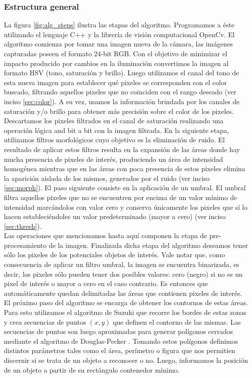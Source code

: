 \subsubsection{Estructura general}
La figura \ref{fig:alg_steps} ilustra las etapas del algoritmo. 
Programamos a \'este utilizando el lenguaje C++ y la librer\'ia de 
visi\'on computacional OpenCv.
El algoritmo comienza por tomar una imagen nueva de la c\'amara, las 
im\'agenes capturadas poseen el formato 24-bit RGB. Con el objetivo de 
minimizar el impacto producido por cambios en la iluminaci\'on 
convertimos la imagen al formato HSV (tono, saturaci\'on y brillo). Luego 
utilizamos el canal del tono de esta nueva imagen para establecer qu\'e 
pixeles se corresponden con el color buscado, filtrando aquellos 
pixeles que no coinciden con el rango deseado (ver inciso 
\ref{sec:color}). A su vez, usamos la informaci\'on brindada por los  canales de saturaci\'on y/o brillo para obtener m\'as precisi\'on sobre el color de los pixeles.\\
	\indent Descartamos los pixeles filtrados en el canal de saturaci\'on 
	realizando una operaci\'on l\'ogica and bit a bit con la imagen filtrada.  En la siguiente 
	etapa, utilizamos filtros morfol\'ogicos cuyo objetivo es la 
	eliminaci\'on de ruido. El resultado de aplicar estos filtros resulta 
	en la expansi\'on de las \'areas donde hay mucha presencia de pixeles de 
	inter\'es, produciendo un \'area de intensidad homog\'enea mientras que 
	en las \'areas con poca presencia de estos pixeles 
	elimina la aparici\'on aislada de los mismos, generados por el ruido (ver 
	inciso \ref{sec:morph}). El paso 
	siguiente consiste en la aplicaci\'on de un umbral. El umbral filtra 
	aquellos pixeles que no se encuentren por encima de un valor m\'inimo 
	de intensidad marc\'andolos con valor cero y conserva \'unicamente los 
	pixeles que s\'i lo hacen estableci\'endoles un valor predeterminado 
	(mayor a cero) (ver inciso \ref{sec:thresh}). \\
	\indent Las operaciones que mencionamos hasta aqu\'i componen la 
	etapa de  pre-procesamiento de la imagen. Finalizada dicha etapa del 
	algoritmo deseamos tener s\'olo los pixeles de los potenciales objetos de 
	inter\'es. Vale notar que, como consecuencia de aplicar un filtro 
	umbral, la imagen se encuentra binarizada, es decir, los pixeles s\'olo 
	pueden tener dos posibles valores: cero (negro) si no es un pixel de 
	inter\'es o mayor a cero en el caso contrario. Es entonces que 
	autom\'aticamente quedan delimitadas las \'areas que contienen pixeles 
	de inter\'es. El pr\'oximo paso del algoritmo se encarga de obtener los 
	contornos de estas \'areas. Para esto utilizamos el algoritmo de Suzuki 
	\cite{suzuki85} que recorre los bordes de estas zonas y crea 
	secuencias de puntos $(x,y)$ que definen el contorno de las mismas. 
	Las secuencias de puntos son luego aproximadas para generar pol\'igonos 
	cerrados mediante el algoritmo de Douglas-Pecker \cite{dp74}. Tomando 
	estos pol\'igonos definimos distintos par\'ametros tales como el \'area, 
	per\'imetro o figura que nos permitien discernir si se trata de un objeto 
	a reconocer o no. Luego, informamos la posici\'on de un objeto a 
	partir de su rect\'angulo contenedor m\'inimo.


